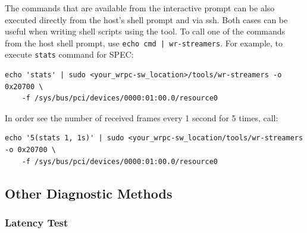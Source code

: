 \documentclass[a4paper, 12pt]{article}
\renewcommand{\_}{\underscore\allowbreak}
\begin{document}
The commands that are available from the interactive prompt can be also executed directly
from the host's shell prompt and via ssh. Both cases can be useful when writing shell
scripts using the tool. To call one of the commands from the host shell prompt, use
\texttt{echo cmd | wr-streamers}. For example, to execute \texttt{stats} command for SPEC:
\begin{lstlisting}
echo 'stats' | sudo <your_wrpc-sw_location>/tools/wr-streamers -o 0x20700 \
    -f /sys/bus/pci/devices/0000:01:00.0/resource0
\end{lstlisting}
In order see the number of received frames every 1 second for 5 times, call:
\begin{lstlisting}
echo '5(stats 1, 1s)' | sudo <your_wrpc-sw_location/tools/wr-streamers -o 0x20700 \
    -f /sys/bus/pci/devices/0000:01:00.0/resource0
\end{lstlisting}

\newpage
\subsection{Other Diagnostic Methods}
\label{Other Diagnostic Tools}

\subsubsection{Latency Test}
\label{Latency Test}
\end{document}
